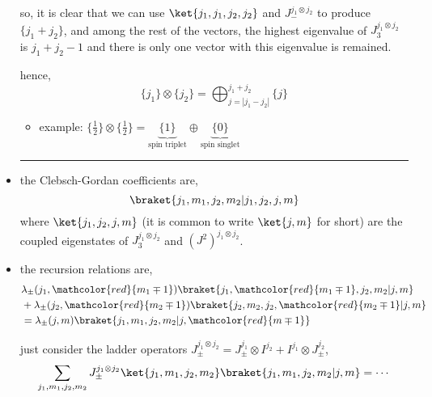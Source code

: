 \begin{itemize}
\begin{tcolorbox}[title=proof:]
		so, it is clear that we can use $\ket{j_1, j_1, j_2, j_2}$ and $J^{j_1 \otimes j_2}_-$ to produce $\{j_1 + j_2\}$, and among the rest of the vectors, the highest eigenvalue of $J^{j_1 \otimes j_2}_3$ is $j_1 + j_2 - 1$ and there is only one vector with this eigenvalue is remained.
		
		hence,
		\begin{equation}
			\{j_1\} \otimes \{j_2\} = \bigoplus_{j = |j_1 - j_2|}^{j_1 + j_2} \{j\}
		\end{equation}
	\end{tcolorbox}
	
	\begin{itemize}
		\item example: $\{\frac{1}{2}\} \otimes \{\frac{1}{2}\} = \underbrace{\{1\}}_{\text{spin triplet}} \oplus \underbrace{\{0\}}_{\text{spin singlet}}$
	\end{itemize}
	
	\noindent\rule[0.5ex]{\linewidth}{0.5pt} %
	
	\item the Clebsch-Gordan coefficients are,
	\begin{equation}
		\braket{j_1, m_1, j_2, m_2 | j_1, j_2, j, m}
	\end{equation}
	where $\ket{j_1, j_2, j, m}$ (it is common to write $\ket{j, m}$ for short) are the coupled eigenstates of $J^{j_1 \otimes j_2}_3$ and $(J^2)^{j_1 \otimes j_2}$.
	
	\item the recursion relations are,
	\begin{align}
		& \lambda_\pm(j_1, \mathcolor{red}{m_1 \mp 1}) \braket{j_1, \mathcolor{red}{m_1 \mp 1}, j_2, m_2 | j, m} \notag \\
		& + \lambda_\pm(j_2, \mathcolor{red}{m_2 \mp 1}) \braket{j_2, m_2, j_2, \mathcolor{red}{m_2 \mp 1} | j, m} \notag \\
		&= \lambda_\pm(j, m) \braket{j_1, m_1, j_2, m_2 | j, \mathcolor{red}{m \mp 1}}
	\end{align}
	
	\begin{tcolorbox}[title=proof:]
		just consider the ladder operators $J^{j_1 \otimes j_2}_\pm = J^{j_1}_\pm \otimes I^{j_2} + I^{j_1} \otimes J^{j_2}_\pm$,
		\begin{equation}
			\sum_{j_1, m_1, j_2, m_2} J^{j_1 \otimes j_2}_\pm \ket{j_1, m_1, j_2, m_2} \braket{j_1, m_1, j_2, m_2 | j, m} = \cdots
		\end{equation}
	\end{tcolorbox}
	

\end{itemize}
